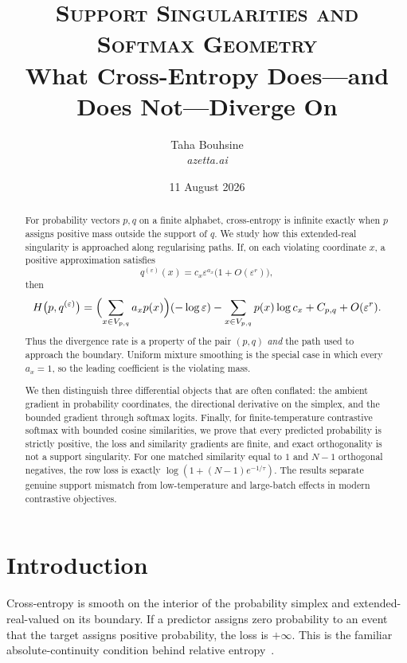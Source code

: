 \documentclass[11pt,a4paper]{article}
\title{%
  \vspace{-1cm}
  {\Large\scshape Support Singularities and Softmax Geometry}\\[0.6em]
  \textbf{What Cross-Entropy Does---and Does Not---Diverge On}
}
\author{Taha Bouhsine\\[0.3em]{\normalsize\textit{azetta.ai}}}
\date{11 August 2026}
\theoremstyle{definition}
\theoremstyle{remark}
\begin{document}
\maketitle

\begin{abstract}
For probability vectors $p,q$ on a finite alphabet, cross-entropy is infinite exactly when $p$ assigns positive mass outside the support of $q$.
We study how this extended-real singularity is approached along regularising paths.
If, on each violating coordinate $x$, a positive approximation satisfies
\[
  q^{(\varepsilon)}(x)
  = c_x\varepsilon^{a_x}\bigl(1+O(\varepsilon^r)\bigr),
\]
then
\[
  H\bigl(p,q^{(\varepsilon)}\bigr)
  = \Bigl(\sum_{x\in V_{p,q}}a_xp(x)\Bigr)(-\log\varepsilon)
    -\sum_{x\in V_{p,q}}p(x)\log c_x
    + C_{p,q}+O(\varepsilon^r).
\]
Thus the divergence rate is a property of the pair $(p,q)$ \emph{and} the path used to approach the boundary.
Uniform mixture smoothing is the special case in which every $a_x=1$, so the leading coefficient is the violating mass.

We then distinguish three differential objects that are often conflated: the ambient gradient in probability coordinates, the directional derivative on the simplex, and the bounded gradient through softmax logits.
Finally, for finite-temperature contrastive softmax with bounded cosine similarities, we prove that every predicted probability is strictly positive, the loss and similarity gradients are finite, and exact orthogonality is not a support singularity.
For one matched similarity equal to $1$ and $N-1$ orthogonal negatives, the row loss is exactly
$\log(1+(N-1)e^{-1/\tau})$.
The results separate genuine support mismatch from low-temperature and large-batch effects in modern contrastive objectives.
\end{abstract}

\tableofcontents

\section{Introduction}
\label{sec:intro}

Cross-entropy is smooth on the interior of the probability simplex and extended-real-valued on its boundary.
If a predictor assigns zero probability to an event that the target assigns positive probability, the loss is $+\infty$.
This is the familiar absolute-continuity condition behind relative entropy~\cite{cover2006elements,csiszar2004information}.
\end{document}
